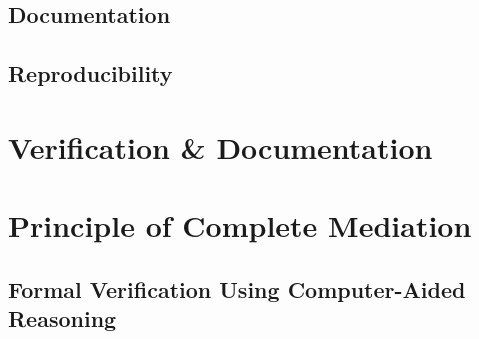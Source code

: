 \documentclass[../../main/main.tex]{subfiles}
\begin{document}
\subsection{Documentation}\label{ssec:documentation}
\subsection{Reproducibility}\label{ssec:reproducibility}

\section{Verification \& Documentation}

\section{Principle of Complete Mediation}

\subsection{Formal Verification Using Computer-Aided Reasoning}
\end{document}
